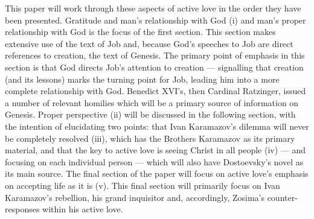 This paper will work through these aspects of active love in the order they have been presented. Gratitude and man's relationship with God (i) and man's proper relationship with God is the focus of the first section. This section makes extensive use of the text of Job and, because God's speeches to Job are direct references to creation, the text of Genesis. The primary point of emphasis in this section is that God directs Job's attention to creation --- signalling that creation (and its lessons) marks the turning point for Job, leading him into a more complete relationship with God. Benedict XVI's, then Cardinal Ratzinger, issued a number of relevant homilies which will be a primary source of information on Genesis. Proper perspective (ii) will be discussed in the following section, with the intention of elucidating two points: that Ivan Karamazov's dilemma will never be completely resolved (iii), which has the Brothers Karamazov as its primary material, and that the key to active love is seeing Christ in all people (iv) --- and focusing on each individual person --- which will also have Dostoevsky's novel as its main source. The final section of the paper will focus on active love's emphasis on accepting life as it is (v). This final section will primarily focus on Ivan Karamazov's rebellion, his grand inquisitor and, accordingly, Zosima's counter-responses within his active love.
